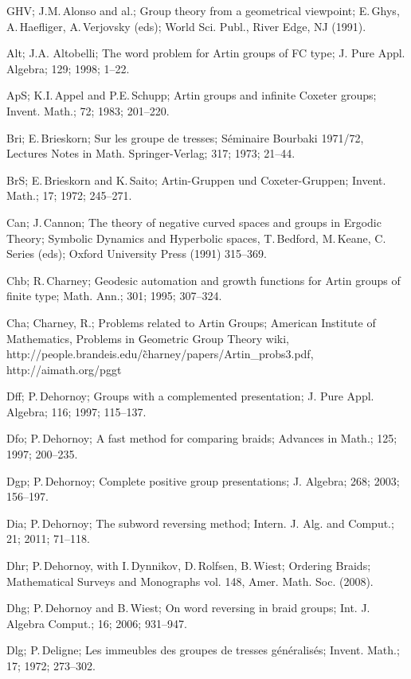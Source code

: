 \documentclass{amsart}
\numberwithin{equation}{section}
\theoremstyle{plain}
\theoremstyle{definition}
\begin{document}
\begin{thebibliography}{99}

\Ref GHV; J.M.\,Alonso and al.; Group theory from a geometrical viewpoint; E.\,Ghys, A.\,Haefliger, A.\,Verjovsky (eds); World Sci. Publ., River Edge, NJ (1991).

\Reff Alt; J.A. Altobelli; The word problem for Artin groups of FC type; J. Pure Appl. Algebra; 129; 1998; 1--22.

\Reff ApS; K.I.\,Appel and P.E.\,Schupp; Artin groups and infinite Coxeter groups; Invent. Math.; 72; 1983; 201--220.

\Reff Bri; E.\,Brieskorn; Sur les groupe de tresses; S\'eminaire Bourbaki 1971/72, Lectures Notes in Math. Springer-Verlag; 317; 1973; 21--44.

\Reff BrS; E.\,Brieskorn and K.\,Saito; Artin-Gruppen und Coxeter-Gruppen; Invent. Math.; 17; 1972; 245--271.

\Ref Can; J.\,Cannon; The theory of negative curved spaces and groups in Ergodic Theory; Symbolic Dynamics and Hyperbolic spaces, T.\,Bedford, M.\,Keane, C. Series (eds); Oxford University Press (1991) 315--369.

\Reff  Chb; R.\,Charney; Geodesic automation and
growth functions for Artin groups of finite type; Math.
Ann.; 301; 1995; 307--324.

\Ref Cha; Charney, R.; Problems related to Artin Groups; American Institute of Mathematics, Problems in Geometric Group Theory wiki, http://people.brandeis.edu/\~charney/papers/Artin\_probs3.pdf, http://aimath.org/pggt

\Reff Dff; P.\,Dehornoy; Groups with a complemented presentation; J. Pure Appl. Algebra; 116; 1997; 115--137.

\Reff Dfo; P.\,Dehornoy; A fast method for comparing braids; Advances in Math.; 125; 1997; 200--235.

\Reff Dgp; P.\,Dehornoy; Complete positive group presentations; J. Algebra; 268; 2003; 156--197.

\Reff Dia; P.\,Dehornoy; The subword reversing method; Intern. J. Alg. and Comput.; 21; 2011; 71--118.

\Ref Dhr; P.\,Dehornoy, with I.\,Dynnikov, D.\,Rolfsen, B.\,Wiest; Ordering Braids; Mathematical Surveys and Monographs vol. 148, Amer. Math. Soc. (2008).

\Reff Dhg; P.\,Dehornoy and B.\,Wiest; On word reversing in braid groups; Int. J. Algebra Comput.; 16; 2006; 931--947.

\Reff Dlg; P.\,Deligne; Les immeubles des groupes de tresses g\'en\'eralis\'es; Invent. Math.; 17; 1972; 273--302.


\end{thebibliography}
\end{document}
